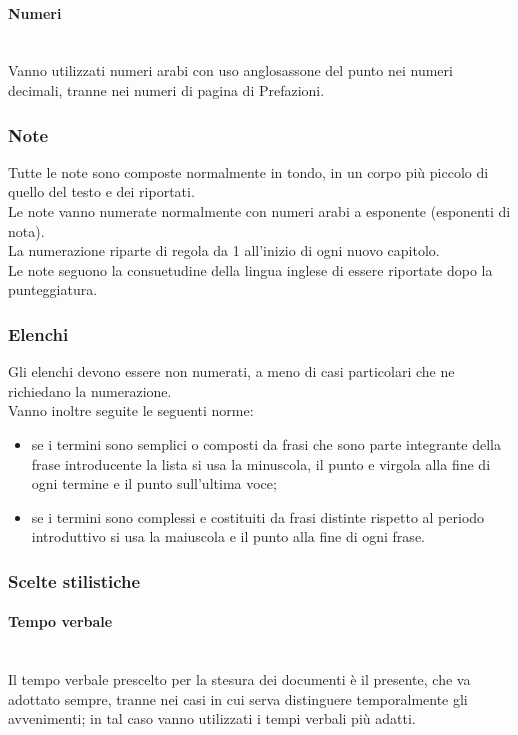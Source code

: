 \paragraph{Numeri} \mbox{} \\
Vanno utilizzati numeri arabi con uso anglosassone del punto nei numeri decimali, tranne nei numeri di pagina di Prefazioni.

\subsubsection{Note}
Tutte le note sono composte normalmente in tondo, in un corpo più piccolo di quello del testo e dei riportati.\\
Le note vanno numerate normalmente con numeri arabi a esponente (esponenti di nota).\\
La numerazione riparte di regola da 1 all'inizio di ogni nuovo capitolo.\\
Le note seguono la consuetudine della lingua inglese di essere riportate dopo la punteggiatura.

\subsubsection{Elenchi}
Gli elenchi devono essere non numerati, a meno di casi particolari che ne richiedano la numerazione.\\
Vanno inoltre seguite le seguenti norme:
\begin{itemize}
	\item se i termini sono semplici o composti da frasi che sono parte integrante della frase introducente la lista si usa la minuscola, il punto e virgola alla fine di ogni termine e il punto sull'ultima voce;
	\item se i termini sono complessi e costituiti da frasi distinte rispetto al periodo introduttivo si usa la maiuscola e il punto alla fine di ogni frase.
\end{itemize}

\subsubsection{Scelte stilistiche}
\paragraph{Tempo verbale} \mbox{} \\
Il tempo verbale prescelto per la stesura dei documenti è il presente, che va adottato sempre, tranne nei casi in cui serva distinguere temporalmente gli avvenimenti; in tal caso vanno utilizzati i tempi verbali più adatti.

